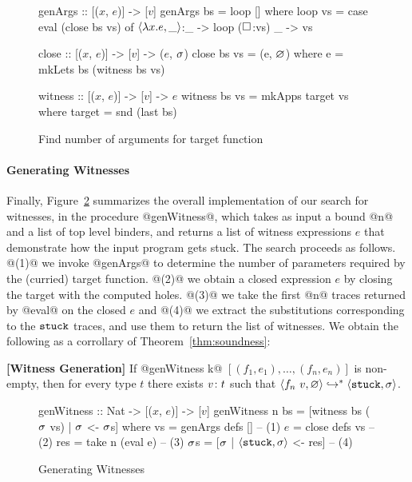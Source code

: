 \begin{figure}[ht]
\centering
\begin{mcode}
genArgs :: [($x$, $e$)] -> [$v$]
genArgs bs = loop []
  where
  loop vs  = case eval (close bs vs) of
               $\langle \lambda x. e, \_ \rangle$:_ -> loop ($\square_{}$:vs)
               _        -> vs

close :: [($x$, $e$)] -> [$v$] -> ($e$, $\sigma$)
close bs vs = (e, $\varnothing$)
  where
    e       = mkLets bs (witness bs vs)

witness :: [($x$, $e$)] -> [$v$] -> $e$
witness bs vs = mkApps target vs
  where
    target    = snd (last bs)
\end{mcode}
\caption{Find number of arguments for target function}
\label{fig:algo-gen-args}
\end{figure}


\paragraph{Generating Witnesses}
%
Finally, Figure~\ref{fig:algo-gen-witness} summarizes the overall
implementation of our search for witnesses, in the procedure @genWitness@,
which takes as input a bound @n@ and a list of top level binders, and
returns a list of witness expressions $e$ that demonstrate how the input
program gets stuck.
%
The search proceeds as follows.
%
@(1)@ we invoke @genArgs@ to determine the number of parameters required
by the (curried) target function.
%
@(2)@ we obtain a closed expression $e$ by closing the target with the
computed holes.
%
@(3)@ we take the first @n@ traces returned by @eval@ on the closed $e$
and
@(4)@ we extract the substitutions corresponding to the $\mathtt{stuck}$ traces,
and use them to return the list of witnesses.
%
We obtain the following as a corrollary of Theorem~\ref{thm:soundness}:

\begin{thm}{\textbf{[Witness Generation]}}
\label{thm:generation}
  If @genWitness k@ $[(f_1, e_1), \ldots, (f_n, e_n)]$ is non-empty,
  then for every type $t$ there exists ${v} \colon {t}$ such that
  $\langle f_n \ v, \varnothing \rangle \hookrightarrow^{*} \langle \mathtt{stuck}, \sigma \rangle$.
\end{thm}

\begin{figure}[ht]
\centering
\begin{mcode}
genWitness :: Nat -> [($x$, $e$)] -> [$v$]
genWitness n bs
       = [witness bs ($\sigma$ vs) | $\sigma$ <- $\sigma$s]
  where
   vs  = genArgs defs []      -- (1)
   $e$    = close defs vs        -- (2)
   res = take n (eval e)      -- (3)
   $\sigma$s   = [$\sigma$ | $\langle \mathtt{stuck}, \sigma \rangle$ <- res]  -- (4)
\end{mcode}
\caption{Generating Witnesses}
\label{fig:algo-gen-witness}
\end{figure}

